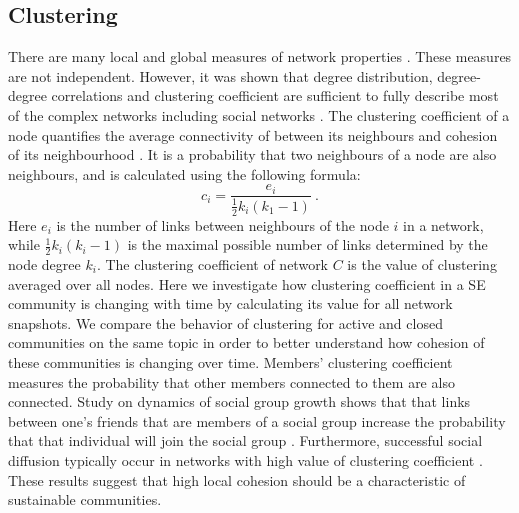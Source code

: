 \subsection{Clustering}
There are many local and global measures of network properties \cite{boccaletti2006complex}. These measures are not independent. However, it was shown that degree distribution, degree-degree correlations and clustering coefficient are sufficient to fully describe most of the complex networks including social networks \cite{orsini2015quantifying}. The clustering coefficient of a node quantifies the average connectivity of between its neighbours and cohesion of its neighbourhood \cite{boccaletti2006complex}. It is a probability that two neighbours of a node are also neighbours, and is calculated using the following formula:
\begin{equation}
c_{i}=\frac{e_{i}}{\frac{1}{2}k_{i}(k_{1}-1)} \ .
\label{eq:clust}
\end{equation}
Here $e_{i}$ is the number of links between neighbours of the node $i$ in a network, while $\frac{1}{2}k_{i}(k_{i}-1)$ is the maximal possible number of links determined by the node degree $k_{i}$. The clustering coefficient of network $C$ is the value of clustering averaged over all nodes. Here we investigate how clustering coefficient in a SE community is changing with time by calculating its value for all network snapshots. We compare the behavior of clustering for active and closed communities on the same topic in order to better understand how cohesion of these communities is changing over time. 
Members' clustering coefficient measures the probability that other members connected to them are also connected. Study on dynamics of social group growth shows that that links between one's friends that are members of a social group increase the probability that that individual will join the social group \cite{backstrom2006group}. Furthermore, successful social diffusion  typically occur in networks with high value of clustering coefficient \cite{centola2007cascade}. These results suggest that high local cohesion should be a characteristic of sustainable communities.

